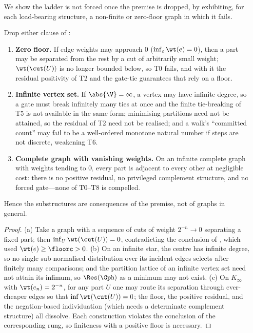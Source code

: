 We show the ladder is not forced once the premise is dropped, by exhibiting, for
each load-bearing structure, a non-finite or zero-floor graph in which it fails.

\begin{proposition}
\label{prop:necessity}
Drop either clause of :
\begin{enumerate}[label=\textup{(\alph*)},leftmargin=2.2em]
\item \textbf{Zero floor.} If edge weights may approach $0$
\textup{(}$\inf_e\wt(e)=0$\textup{)}, then a part may be separated from the rest
by a cut of arbitrarily small weight; $\wt(\cut(U))$ is no longer bounded below,
so T0 fails, and with it the residual positivity of T2 and the gate-tie
guarantees that rely on a floor.
\item \textbf{Infinite vertex set.} If $\abs{\V}=\infty$, a vertex may have
infinite degree, so a gate must break infinitely many ties at once and the finite
tie-breaking of T5 is not available in the same form; minimising partitions need
not be attained, so the residual of T2 need not be realised; and a walk's
``committed count'' may fail to be a well-ordered monotone natural number if
steps are not discrete, weakening T6.
\item \textbf{Complete graph with vanishing weights.} On an infinite complete
graph with weights tending to $0$, every part is adjacent to every other at
negligible cost: there is no positive residual, no privileged complement
structure, and no forced gate---none of T0--T8 is compelled.
\end{enumerate}
Hence the substructures are consequences of the premise, not of graphs in
general.
\end{proposition}

\begin{proof}
(a) Take a graph with a sequence of cuts of weight $2^{-n}\to0$ separating a
fixed part; then $\inf_U\wt(\cut(U))=0$, contradicting the conclusion of
, which used $\wt(e)\ge\floorc>0$. (b) On an infinite star, the
centre has infinite degree, so no single sub-normalised distribution over its
incident edges selects after finitely many comparisons; and the partition lattice
of an infinite vertex set need not attain its infimum, so $\Res(\Gph)$ as a
minimum may not exist. (c) On $K_\infty$ with $\wt(e_n)=2^{-n}$, for any part $U$
one may route its separation through ever-cheaper edges so that
$\inf\wt(\cut(U))=0$; the floor, the positive residual, and the negation-based
individuation (which needs a determinate complement structure) all dissolve.
Each construction violates the conclusion of the corresponding rung, so finiteness
with a positive floor is necessary.
\end{proof}


